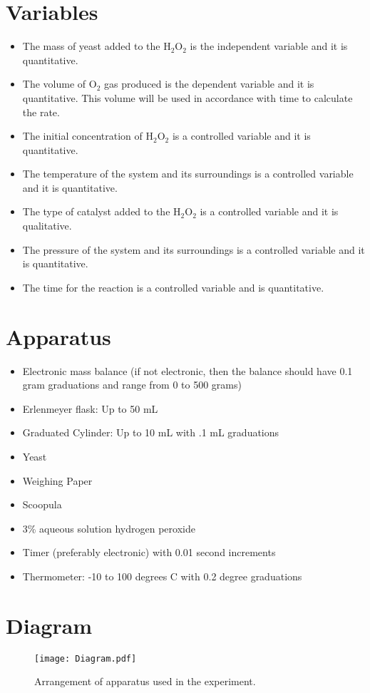 \documentclass[10pt, letterpaper]{article}
\begin{document}
\section{Variables}
\begin{itemize}
\item{The mass of yeast added to the H$_2$O$_2$ is the independent variable and it is quantitative.}
\item{The volume of O$_2$ gas produced is the dependent variable and it is quantitative. This volume will be used in accordance with time to calculate the rate.}
\item{The initial concentration of H$_2$O$_2$ is a controlled variable and it is quantitative.}
\item{The temperature of the system and its surroundings is a controlled variable and it is quantitative.}
\item{The type of catalyst added to the H$_2$O$_2$ is a controlled variable and it is qualitative.}
\item{The pressure of the system and its surroundings is a controlled variable and it is quantitative.}
\item{The time for the reaction is a controlled variable and is quantitative.}
\end{itemize}

\section{Apparatus
}
\begin{itemize}
\item{Electronic mass balance (if not electronic, then the balance should have 0.1 gram graduations and range from 0 to 500 grams)}
\item{Erlenmeyer flask: Up to 50 mL}
\item{Graduated Cylinder: Up to 10 mL with .1 mL graduations}
\item{Yeast}
\item{Weighing Paper}
\item{Scoopula}
\item{3\% aqueous solution hydrogen peroxide}
\item{Timer (preferably electronic) with 0.01 second increments}
\item{Thermometer: -10 to 100 degrees C with 0.2 degree graduations}
\end{itemize}

\section{Diagram}
\begin{figure}[!htb]
\centering
\texttt{[image: Diagram.pdf]}
\caption{Arrangement of apparatus used in the experiment.}
\label{fig:digraph}
\end{figure}
\end{document}

